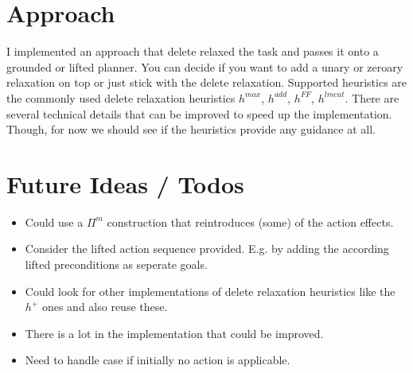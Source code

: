 \documentclass[twocolumn]{article}
\newcommand{\task}{\ensuremath{\Pi}\xspace}
\begin{document}
	\section{Approach}
	
	I implemented an approach that delete relaxed the task and passes it onto a grounded or lifted planner.
	You can decide if you want to add a unary or zeroary relaxation on top or just stick with the delete relaxation.
	Supported heuristics are the commonly used delete relaxation heuristics $h^{max}$, $h^{add}$, $h^{FF}$, $h^{lmcut}$.
	There are several technical details that can be improved to speed up the implementation.
	Though, for now we should see if the heuristics provide any guidance at all.
		
	\section{Future Ideas / Todos}
	
	\begin{itemize}
		\item Could use a $\task^{m}$ construction that reintroduces (some) of the action effects.
		\item Consider the lifted action sequence provided. E.g. by adding the according lifted preconditions as seperate goals.
		\item Could look for other implementations of delete relaxation heuristics like the $h^{+}$ ones and also reuse these.
		\item There is a lot in the implementation that could be improved.
		\item Need to handle case if initially no action is applicable.
	\end{itemize}
	
	
	
	
\end{document}
